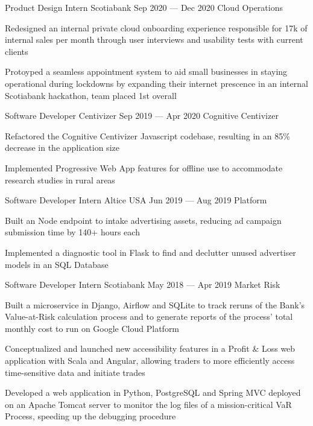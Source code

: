 \begin{cventries}
  \cventry
    {Product Design Intern}
    {Scotiabank}
    {}
    {Sep 2020 --- Dec 2020}
    {Cloud Operations}
    {
      \begin{cvitems}
        \item {Redesigned an internal private cloud onboarding experience responsible for 17k of internal sales per month through user interviews and usability tests with current clients}
        \item {Protoyped a seamless appointment system to aid small businesses in staying operational during lockdowns by expanding their internet prescence in an internal Scotiabank hackathon, team placed 1st overall}
      \end{cvitems}
    }
  \cventry
    {Software Developer}
    {Centivizer}
    {}
    {Sep 2019 --- Apr 2020}
    {Cognitive Centivizer}
    {
      \begin{cvitems}
        \item {Refactored the Cognitive Centivizer Javascript codebase, resulting in an 85\% decrease in the application size}
        \item {Implemented Progressive Web App features for offline use to accommodate research studies in rural areas}
      \end{cvitems}
    }

  \cventry
    {Software Developer Intern}
    {Altice USA}
    {}
    {Jun 2019 --- Aug 2019}
    {Platform}
    {
    \begin{cvitems}
      \item {Built an Node endpoint to intake advertising assets, reducing ad campaign submission time by 140+ hours each}
      \item {Implemented a diagnostic tool in Flask to find and declutter unused advertiser models in an SQL Database}
    \end{cvitems}
    }

  \cventry
    {Software Developer Intern}
    {Scotiabank}
    {}
    {May 2018 --- Apr 2019}
    {Market Risk}
    {
      \begin{cvitems}
        \item {Built a microservice in Django, Airflow and SQLite to track reruns of the Bank's Value-at-Risk calculation process and to generate reports of the process' total monthly cost to run on Google Cloud Platform}
        \item {Conceptualized and launched new accessibility features in a Profit \& Loss web application with Scala and Angular, allowing traders to more efficiently access time-sensitive data and initiate trades}
        \item {Developed a web application in Python, PostgreSQL and Spring MVC deployed on an Apache Tomcat server to monitor the log files of a mission-critical VaR Process, speeding up the debugging procedure}
      \end{cvitems}
    }
\end{cventries}
